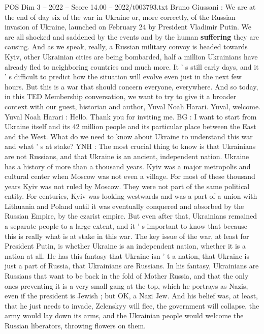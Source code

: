\begin{textsample}{POS Dim 3 – 2022 – Score 14.00 – 2022/t003793.txt}  \label{ex:f3_pos_021}
Bruno Giussani : We are at the end of day six of the war in Ukraine or, more correctly, of the Russian invasion of Ukraine, launched on February 24 by President Vladimir Putin.
We are all shocked and saddened by the events and by the human \textbf{suffering} they are causing.
And as we speak, really, a Russian military convoy is headed towards Kyiv, other Ukrainian cities are being bombarded, half a million Ukrainians have already fled to neighboring countries and much more.
It ' s still early days, and it ' s difficult to predict how the situation will evolve even just in the next few hours.
But this is a war that should concern everyone, everywhere.
And so today, in this TED Membership conversation, we want to try to give it a broader context with our guest, historian and author, Yuval Noah Harari.
Yuval, welcome.
Yuval Noah Harari : Hello.
Thank you for inviting me.
BG : I want to start from Ukraine itself and its 42 million people and its particular place between the East and the West.
What do we need to know about Ukraine to understand this war and what ' s at stake?
YNH : The most crucial thing to know is that Ukrainians are not Russians, and that Ukraine is an ancient, independent nation.
Ukraine has a history of more than a thousand years.
Kyiv was a major metropolis and cultural center when Moscow was not even a village.
For most of these thousand years Kyiv was not ruled by Moscow.
They were not part of the same political entity.
For centuries, Kyiv was looking westwards and was a part of a union with Lithuania and Poland until it was eventually conquered and absorbed by the Russian Empire, by the czarist empire.
But even after that, Ukrainians remained a separate people to a large extent, and it ' s important to know that because this is really what is at stake in this war.
The key issue of the war, at least for President Putin, is whether Ukraine is an independent nation, whether it is a nation at all.
He has this fantasy that Ukraine isn ' t a nation, that Ukraine is just a part of Russia, that Ukrainians are Russians.
In his fantasy, Ukrainians are Russians that want to be back in the fold of Mother Russia, and that the only ones preventing it is a very small gang at the top, which he portrays as Nazis, even if the president is Jewish ; but OK, a Nazi Jew.
And his belief was, at least, that he just needs to invade, Zelenskyy will flee, the government will collapse, the army would lay down its arms, and the Ukrainian people would welcome the Russian liberators, throwing flowers on them.

\end{textsample}
